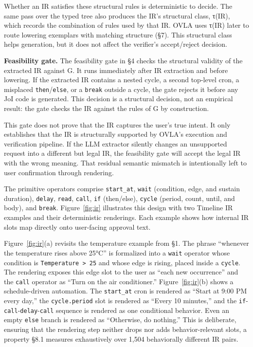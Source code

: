 \documentclass[sigconf,nonacm,anonymous,review]{acmart}
\begin{document}
Whether an IR satisfies these structural rules is deterministic to decide. The same pass over the typed tree also produces the IR's structural class, τ(IR), which records the combination of rules used by that IR. OVLA uses τ(IR) later to route lowering exemplars with matching structure (\S7). This structural class helps generation, but it does not affect the verifier's accept/reject decision.

\textbf{Feasibility gate.} The feasibility gate in \S4 checks the structural validity of the extracted IR against G. It runs immediately after IR extraction and before lowering. If the extracted IR contains a nested cycle, a second top-level cron, a misplaced \texttt{then}/\texttt{else}, or a \texttt{break} outside a cycle, the gate rejects it before any JoI code is generated. This decision is a structural decision, not an empirical result: the gate checks the IR against the rules of G by construction.

This gate does not prove that the IR captures the user's true intent. It only establishes that the IR is structurally supported by OVLA's execution and verification pipeline. If the LLM extractor silently changes an unsupported request into a different but legal IR, the feasibility gate will accept the legal IR with the wrong meaning. That residual semantic mismatch is intentionally left to user confirmation through rendering. %

The primitive operators comprise \texttt{start\_at}, \texttt{wait} (condition, edge, and sustain duration), \texttt{delay}, \texttt{read}, \texttt{call}, \texttt{if} (then/else), \texttt{cycle} (period, count, until, and body), and \texttt{break}. Figure~\ref{fig:ir} illustrates this design with two Timeline IR examples and their deterministic renderings. Each example shows how internal IR slots map directly onto user-facing approval text.

Figure~\ref{fig:ir}(a) revisits the temperature example from \S1. The phrase ``whenever the temperature rises above 25°C'' is formalized into a \texttt{wait} operator whose condition is \texttt{Temperature > 25} and whose edge is rising, placed inside a \texttt{cycle}. The rendering exposes this edge slot to the user as ``each new occurrence'' and the \texttt{call} operator as ``Turn on the air conditioner.'' Figure~\ref{fig:ir}(b) shows a schedule-driven automation. The \texttt{start\_at} cron is rendered as ``Start at 9:00 PM every day,'' the \texttt{cycle.period} slot is rendered as ``Every 10 minutes,'' and the \texttt{if}-\texttt{call}-\texttt{delay}-\texttt{call} sequence is rendered as one conditional behavior. Even an empty \texttt{else} branch is rendered as ``Otherwise, do nothing.'' This is deliberate, ensuring that the rendering step neither drops nor adds behavior-relevant slots, a property \S8.1 measures exhaustively over 1,504 behaviorally different IR pairs.
\end{document}

